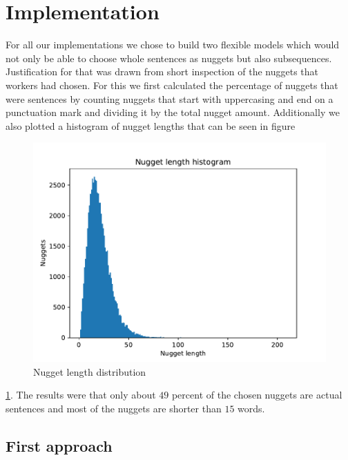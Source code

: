 \documentclass{article}
\begin{document}
\section{Implementation}
\label{headings}


For all our implementations we chose to build two flexible models which would not only be able to choose whole sentences as nuggets but also subsequences. Justification for that was drawn from short inspection of the nuggets that workers had chosen. For this we first calculated the percentage of nuggets that were sentences by counting nuggets that start with uppercasing and end on a punctuation mark and dividing it by the total nugget amount. Additionally we also plotted a histogram of nugget lengths that can be seen in figure
\begin{figure}[!ht]
	\centering
	\includegraphics[width=0.55\linewidth]{Nugget_size.pdf}
	\caption{Nugget length distribution}
	\label{fig:nuggets}
\end{figure}
\ref{fig:nuggets}.
The results were that only about $49$ percent of the chosen nuggets are actual sentences and most of the nuggets are shorter than $15$ words.

\subsection{First approach}
\end{document}

